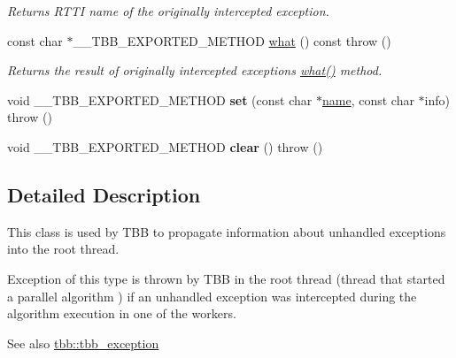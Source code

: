 \begin{DoxyCompactItemize}
\begin{DoxyCompactList}\small\item\em Returns R\+T\+T\+I name of the originally intercepted exception. \end{DoxyCompactList}\item 
\hypertarget{classtbb_1_1captured__exception_ac97ee315d8613c803dae2f6d3e0b91a7}{}const char $\ast$\+\_\+\+\_\+\+T\+B\+B\+\_\+\+E\+X\+P\+O\+R\+T\+E\+D\+\_\+\+M\+E\+T\+H\+O\+D \hyperlink{classtbb_1_1captured__exception_ac97ee315d8613c803dae2f6d3e0b91a7}{what} () const   throw ()\label{classtbb_1_1captured__exception_ac97ee315d8613c803dae2f6d3e0b91a7}

\begin{DoxyCompactList}\small\item\em Returns the result of originally intercepted exception\textquotesingle{}s \hyperlink{classtbb_1_1captured__exception_ac97ee315d8613c803dae2f6d3e0b91a7}{what()} method. \end{DoxyCompactList}\item 
\hypertarget{classtbb_1_1captured__exception_aa72deb29316e8c08700f7e6afa4a48e8}{}void \+\_\+\+\_\+\+T\+B\+B\+\_\+\+E\+X\+P\+O\+R\+T\+E\+D\+\_\+\+M\+E\+T\+H\+O\+D {\bfseries set} (const char $\ast$\hyperlink{classtbb_1_1captured__exception_a23426113851b78d3f0069956afd21976}{name}, const char $\ast$info)  throw ()\label{classtbb_1_1captured__exception_aa72deb29316e8c08700f7e6afa4a48e8}

\item 
\hypertarget{classtbb_1_1captured__exception_a0b160c0fc5d2fab90df2be96ea14088a}{}void \+\_\+\+\_\+\+T\+B\+B\+\_\+\+E\+X\+P\+O\+R\+T\+E\+D\+\_\+\+M\+E\+T\+H\+O\+D {\bfseries clear} ()  throw ()\label{classtbb_1_1captured__exception_a0b160c0fc5d2fab90df2be96ea14088a}

\end{DoxyCompactItemize}


\subsection{Detailed Description}
This class is used by T\+B\+B to propagate information about unhandled exceptions into the root thread. 

Exception of this type is thrown by T\+B\+B in the root thread (thread that started a parallel algorithm ) if an unhandled exception was intercepted during the algorithm execution in one of the workers. \begin{DoxySeeAlso}{See also}
\hyperlink{classtbb_1_1tbb__exception}{tbb\+::tbb\+\_\+exception} 
\end{DoxySeeAlso}


